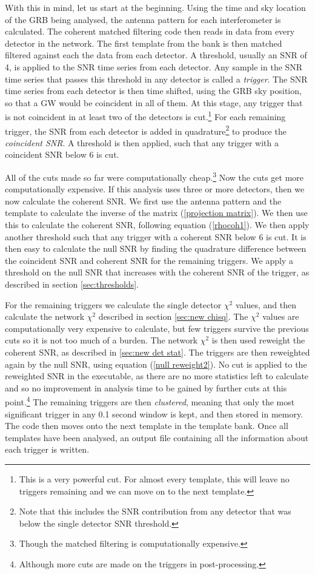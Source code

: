 \documentclass[11pt]{cuthesis}
\begin{document}
With this in mind, let us start at the beginning. Using the time and sky location of the GRB being analysed, the antenna pattern for each interferometer is calculated. The coherent matched filtering code then reads in data from every detector in the network. The first template from the bank is then matched filtered against each the data from each detector. A threshold, usually an SNR of 4, is applied to the SNR time series from each detector. Any sample in the SNR time series that passes this threshold in any detector is called a \textit{trigger}. The SNR time series from each detector is then time shifted, using the GRB sky position, so that a GW would be coincident in all of them. At this stage, any trigger that is not coincident in at least two of the detectors is cut.\footnote{This is a very powerful cut. For almost every template, this will leave no triggers remaining and we can move on to the next template.} For each remaining trigger, the SNR from each detector is added in quadrature\footnote{Note that this includes the SNR contribution from any detector that was below the single detector SNR threshold.} to produce the \textit{coincident SNR}. A threshold is then applied, such that any trigger with a coincident SNR below 6 is cut. 

All of the cuts made so far were computationally cheap.\footnote{Though the matched filtering is computationally expensive.} Now the cuts get more computationally expensive. If this analysis uses three or more detectors, then we now calculate the coherent SNR. We first use the antenna pattern and the template to calculate the inverse of the matrix (\ref{projection matrix}). We then use this to calculate the coherent SNR, following equation (\ref{rhocoh1}). We then apply another threshold such that any trigger with a coherent SNR below 6 is cut. It is then easy to calculate the null SNR by finding the quadrature difference between the coincident SNR and coherent SNR for the remaining triggers. We apply a threshold on the null SNR that increases with the coherent SNR of the trigger, as described in section \ref{sec:thresholds}.

For the remaining triggers we calculate the single detector $\chi^2$ values, and then calculate the network $\chi^2$ described in section \ref{sec:new chisq}. The $\chi^2$ values are computationally very expensive to calculate, but few triggers survive the previous cuts so it is not too much of a burden. The network $\chi^2$ is then used reweight the coherent SNR, as described in \ref{sec:new det stat}. The triggers are then reweighted again by the null SNR, using equation (\ref{null reweight2}). No cut is applied to the reweighted SNR in the executable, as there are no more statistics left to calculate and so no improvement in analysis time to be gained by further cuts at this point.\footnote{Although more cuts are made on the triggers in post-processing.} The remaining triggers are then \textit{clustered}, meaning that only the most significant trigger in any 0.1 second window is kept, and then stored in memory. The code then moves onto the next template in the template bank. Once all templates have been analysed, an output file containing all the information about each trigger is written.
\end{document}

